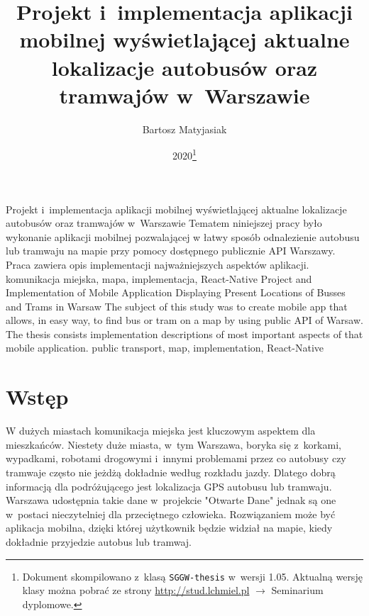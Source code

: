 \documentclass{SGGW-thesis}
\title{Projekt i~implementacja aplikacji mobilnej wyświetlającej aktualne lokalizacje autobusów oraz tramwajów w~Warszawie}
\author{Bartosz Matyjasiak}
\date{2020\footnote{Dokument skompilowano z~klasą {\tt SGGW-thesis} w~wersji 1.05. Aktualną wersję klasy można pobrać ze strony \url{http://stud.lchmiel.pl} $\rightarrow$ Seminarium dyplomowe.}}
\begin{document}
\maketitle
\statementpage
\abstractpage
{Projekt i~implementacja aplikacji mobilnej wyświetlającej aktualne lokalizacje autobusów oraz tramwajów w~Warszawie}
{
Tematem niniejszej pracy było wykonanie aplikacji mobilnej pozwalającej w łatwy sposób odnalezienie autobusu lub tramwaju na mapie przy pomocy dostępnego publicznie API Warszawy.
Praca zawiera opis implementacji najważniejszych aspektów aplikacji.
}
{komunikacja miejska, mapa, implementacja, React-Native}
{Project and Implementation of Mobile Application Displaying Present Locations of Busses and Trams in Warsaw}
{
The subject of this study was to create mobile app that allows, in easy way, to find bus or tram on a map by using public API of Warsaw.
The thesis consists implementation descriptions of most important aspects of that mobile application.
}
{public transport, map, implementation, React-Native}


{
  \doublespacing
  \tableofcontents
}

\startchapterfromoddpage %


\chapter{Wstęp}
W dużych miastach komunikacja miejska jest kluczowym aspektem dla mieszkańców.
Niestety duże miasta, w~tym Warszawa, boryka się z~korkami, wypadkami, robotami drogowymi i~innymi problemami przez
co autobusy czy tramwaje często nie jeżdżą dokładnie według rozkładu jazdy.
Dlatego dobrą informacją dla podróżującego jest lokalizacja GPS autobusu lub tramwaju.
Warszawa udostępnia takie dane w~projekcie "Otwarte Dane" \cite{APIWARSZAWA} jednak są one w~postaci nieczytelniej dla przeciętnego człowieka.
Rozwiązaniem może być aplikacja mobilna, dzięki której użytkownik będzie widział na mapie, kiedy dokładnie przyjedzie autobus lub tramwaj.
\end{document}
